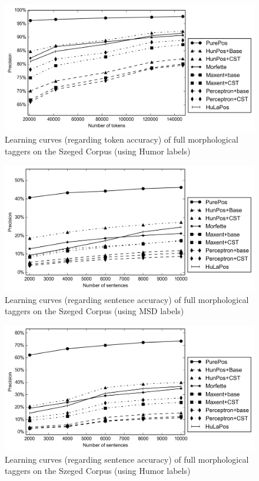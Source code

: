 \begin{figure}[H]
  \centering
  \includegraphics[width=1\textwidth]{MorphTagging/humor_token.png}
  \caption{Learning curves (regarding token accuracy) of full morphological taggers on the Szeged Corpus (using Humor labels)}
  \label{fig:humor-token}
\end{figure}

\begin{figure}[H]
  \centering
  \includegraphics[width=1\textwidth]{MorphTagging/msd_sent.png} 
  \caption{Learning curves (regarding sentence accuracy) of full morphological taggers on the Szeged Corpus (using MSD labels)}
  \label{fig:msd-sent}
\end{figure}

\begin{figure}[H]
  \centering
  \includegraphics[width=1\textwidth]{MorphTagging/humor_sent.png}
  \caption{Learning curves (regarding sentence accuracy) of full morphological taggers on the Szeged Corpus (using Humor labels)}
  \label{fig:humor-sent}
\end{figure}

